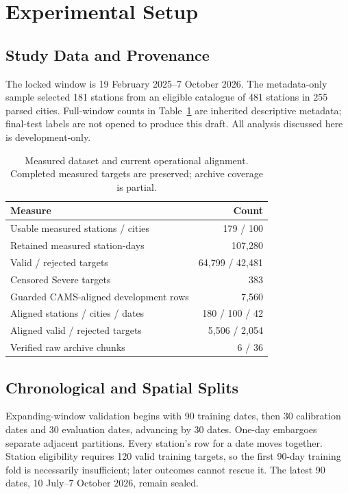 \section{Experimental Setup}
\subsection{Study Data and Provenance}
The locked window is 19 February 2025--7 October 2026. The metadata-only
sample selected 181 stations from an eligible catalogue of 481 stations in
255 parsed cities. Full-window counts in Table~\ref{tab:data} are inherited
descriptive metadata; final-test labels are not opened to produce this draft.
All analysis discussed here is development-only.
\begin{table}[t]\centering\footnotesize
\caption{Measured dataset and current operational alignment. Completed measured targets are preserved; archive coverage is partial.}
\label{tab:data}
\setlength{\tabcolsep}{4pt}
\begin{tabular}{lr}
\toprule
Measure & Count\\\midrule
Usable measured stations / cities & 179 / 100\\
Retained measured station-days & 107,280\\
Valid / rejected targets & 64,799 / 42,481\\
Censored Severe targets & 383\\
Guarded CAMS-aligned development rows & 7,560\\
Aligned stations / cities / dates & 180 / 100 / 42\\
Aligned valid / rejected targets & 5,506 / 2,054\\
Verified raw archive chunks & 6 / 36\\
\bottomrule\end{tabular}
\end{table}
\subsection{Chronological and Spatial Splits}
Expanding-window validation begins with 90 training dates, then 30 calibration
dates and 30 evaluation dates, advancing by 30 dates. One-day embargoes
separate adjacent partitions. Every station's row for a date moves together.
Station eligibility requires 120 valid training targets, so the first 90-day
training fold is necessarily insufficient; later outcomes cannot rescue it.
The latest 90 dates, 10 July--7 October 2026, remain sealed.

